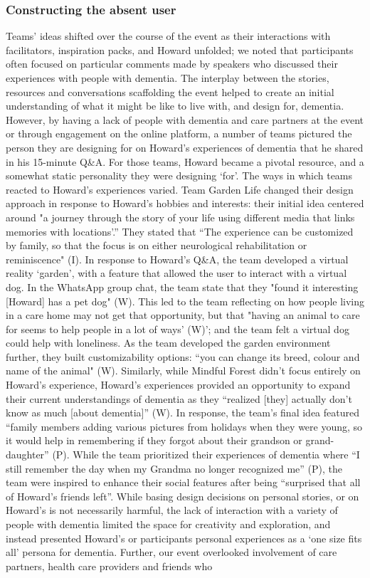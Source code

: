 \subsubsection{Constructing the absent user}
\label{ThemeTwo:subthemeOne}
Teams’ ideas shifted over the course of the event as their interactions with facilitators, inspiration packs, and Howard unfolded; we noted that participants often focused on particular comments made by speakers who discussed their experiences with people with dementia. The interplay between the stories, resources and conversations scaffolding the event helped to create an initial understanding of what it might be like to live with, and design for, dementia. However, by having a lack of people with dementia and care partners at the event or through engagement on the online platform, a number of teams pictured the person they are designing for on Howard’s experiences of dementia that he shared in his 15-minute Q\&A. For those teams, Howard became a pivotal resource, and a somewhat static personality they were designing ‘for’. The ways in which teams reacted to Howard’s experiences varied. Team Garden Life changed their design approach in response to Howard's hobbies and interests: their initial idea centered around "a journey through the story of your life using different media that links memories with locations'.” They stated that “The experience can be customized by family, so that the focus is on either neurological rehabilitation or reminiscence" (I). In response to Howard’s Q\&A, the team developed a virtual reality ‘garden’, with a feature that allowed the user to interact with a virtual dog. In the WhatsApp group chat, the team state that they "found it interesting [Howard] has a pet dog" (W). This led to the team reflecting on how people living in a care home may not get that opportunity, but that "having an animal to care for seems to help people in a lot of ways' (W)'; and the team felt a virtual dog could help with loneliness. As the team developed the garden environment further, they built customizability options: “you can change its breed, colour and name of the animal" (W). Similarly, while Mindful Forest didn’t focus entirely on Howard’s experience, Howard’s experiences provided an opportunity to expand their current understandings of dementia as they “realized [they] actually don’t know as much [about dementia]” (W). In response, the team’s final idea featured “family members adding various pictures from holidays when they were young, so it would help in remembering if they forgot about their grandson or grand-daughter” (P). While the team prioritized their experiences of dementia where “I still remember the day when my Grandma no longer recognized me” (P),  the team were inspired to enhance their social features after being “surprised that all of Howard’s friends left”.  While basing design decisions on personal stories, or on Howard’s is not necessarily harmful, the lack of interaction with a variety of people with dementia limited the space for creativity and exploration, and instead presented Howard’s or participants personal experiences as a ‘one size fits all’ persona for dementia. Further, our event overlooked involvement of care partners, health care providers and friends who 